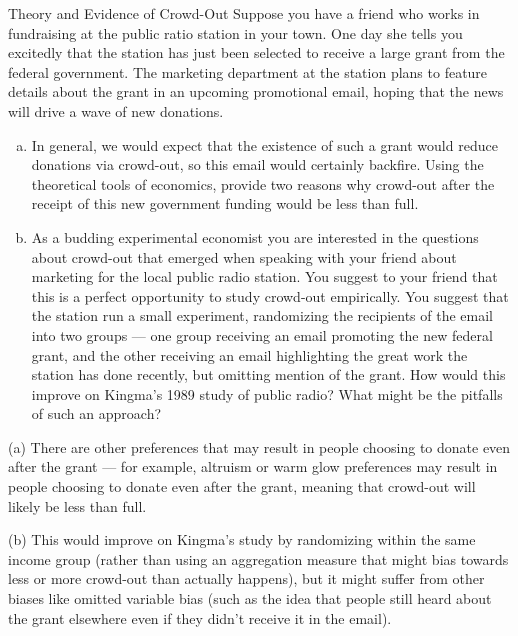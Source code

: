 \documentclass[10pt]{extarticle}
\begin{document}
  \begin{problem}{Theory and Evidence of Crowd-Out}
    Suppose you have a friend who works in fundraising at the public ratio station in your town. One day she tells you excitedly that the station has just been selected to receive a large grant from the federal government. The marketing department at the station plans to feature details about the grant in an upcoming promotional email, hoping that the news will drive a wave of new donations.
    \begin{enumerate}[(a)]
      \item In general, we would expect that the existence of such a grant would reduce donations via crowd-out, so this email would certainly backfire. Using the theoretical tools of economics, provide two reasons why crowd-out after the receipt of this new government funding would be less than full.
      \item As a budding experimental economist you are interested in the questions about crowd-out that emerged when speaking with your friend about marketing for the local public radio station. You suggest to your friend that this is a perfect opportunity to study crowd-out empirically. You suggest that the station run a small experiment, randomizing the recipients of the email into two groups --- one group receiving an email promoting the new federal grant, and the other receiving an email highlighting the great work the station has done recently, but omitting mention of the grant. How would this improve on Kingma’s 1989 study of public radio? What might be the pitfalls of such an approach?
    \end{enumerate}
    \tcblower
    \begin{problem}{(a)}
      There are other preferences that may result in people choosing to donate even after the grant --- for example, altruism or warm glow preferences may result in people choosing to donate even after the grant, meaning that crowd-out will likely be less than full.
    \end{problem}
    \begin{problem}{(b)}
      This would improve on Kingma's study by randomizing within the same income group (rather than using an aggregation measure that might bias towards less or more crowd-out than actually happens), but it might suffer from other biases like omitted variable bias (such as the idea that people still heard about the grant elsewhere even if they didn't receive it in the email).
    \end{problem}
  \end{problem}
\end{document}
